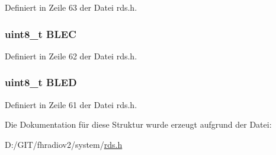 Definiert in Zeile 63 der Datei rds.\+h.

\hypertarget{structerr_a279b7213c9f5034e0fa7aa8d9c2bc9a2}{}
\subsubsection[{B\+L\+E\+C}]{\setlength{\rightskip}{0pt plus 5cm}uint8\+\_\+t B\+L\+E\+C}\label{structerr_a279b7213c9f5034e0fa7aa8d9c2bc9a2}


Definiert in Zeile 62 der Datei rds.\+h.

\hypertarget{structerr_a3498d51c8fc84119a00242f7bb9b6719}{}
\subsubsection[{B\+L\+E\+D}]{\setlength{\rightskip}{0pt plus 5cm}uint8\+\_\+t B\+L\+E\+D}\label{structerr_a3498d51c8fc84119a00242f7bb9b6719}


Definiert in Zeile 61 der Datei rds.\+h.



Die Dokumentation für diese Struktur wurde erzeugt aufgrund der Datei\+:\begin{DoxyCompactItemize}
\item 
D\+:/\+G\+I\+T/fhradiov2/system/\hyperlink{rds_8h}{rds.\+h}\end{DoxyCompactItemize}

